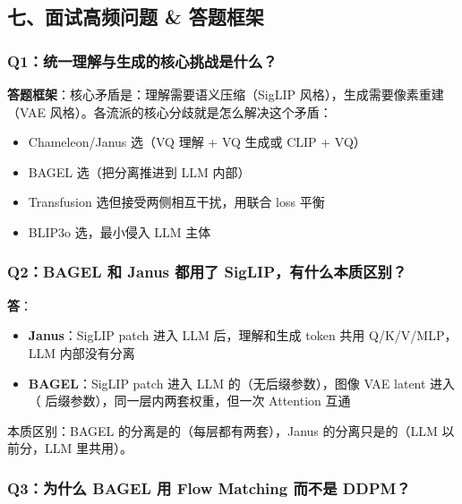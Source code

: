 \subsection{七、面试高频问题 \& 答题框架}

\subsubsection{Q1：统一理解与生成的核心挑战是什么？}

\begin{summarybox}
\textbf{答题框架}：核心矛盾是：理解需要语义压缩（SigLIP 风格），生成需要像素重建（VAE 风格）。各流派的核心分歧就是怎么解决这个矛盾：
\begin{itemize}
  \item Chameleon/Janus 选（VQ 理解 + VQ 生成或 CLIP + VQ）
  \item BAGEL 选（把分离推进到 LLM 内部）
  \item Transfusion 选但接受两侧相互干扰，用联合 loss 平衡
  \item BLIP3o 选，最小侵入 LLM 主体
\end{itemize}
\end{summarybox}

\subsubsection{Q2：BAGEL 和 Janus 都用了 SigLIP，有什么本质区别？}

\begin{summarybox}
\textbf{答}：
\begin{itemize}
  \item \textbf{Janus}：SigLIP patch 进入 LLM 后，理解和生成 token 共用 Q/K/V/MLP，LLM 内部没有分离
  \item \textbf{BAGEL}：SigLIP patch 进入 LLM 的（无后缀参数），图像 VAE latent 进入（ 后缀参数），同一层内两套权重，但一次 Attention 互通
\end{itemize}
本质区别：BAGEL 的分离是的（每层都有两套），Janus 的分离只是的（LLM 以前分，LLM 里共用）。
\end{summarybox}

\subsubsection{Q3：为什么 BAGEL 用 Flow Matching 而不是 DDPM？}

